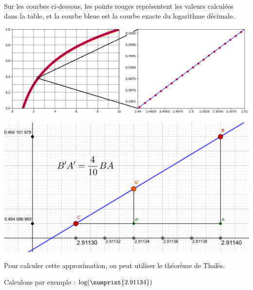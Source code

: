 \documentclass[a4paper, twoside]{article}
\begin{document}
		Sur les courbes ci-dessous, les points rouges représentent les valeurs calculées dans la table, et la courbe bleue est la courbe exacte du logarithme décimale.

	\vspace{-1 mm}

	\begin{center}
		{              \noindent \includegraphics[scale = 0.45]{Approx log zoom.png } }
		
		{\vspace{3 mm} \noindent \includegraphics[scale = 0.225]{Log/Log Geogebra.png} }
	\end{center}

	Pour calculer cette approximation, on peut utiliser le théorème de Thalès.

	\vspace{1 mm}

	{\noindent Calculons par exemple : $\log(\numprint{2.91134})$}

	\vspace{1 mm}
\end{document}
